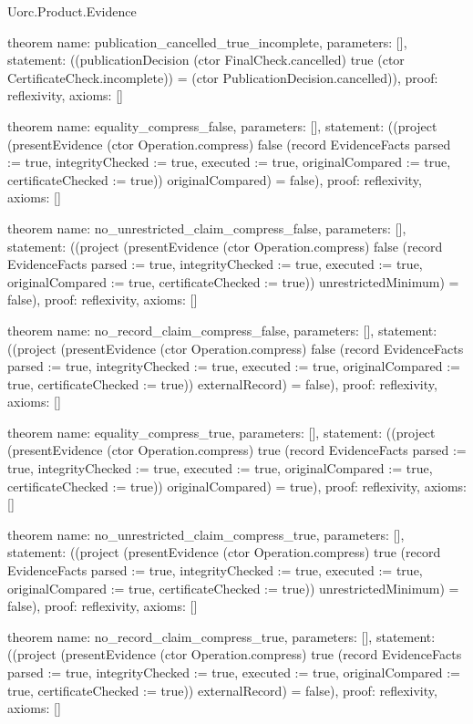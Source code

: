 \begin{lexlean}{Uorc.Product.Evidence}
\begin{semanticmodule}
theorem{
  name: publication_cancelled_true_incomplete,
  parameters: [],
  statement: ((publicationDecision (ctor FinalCheck.cancelled) true (ctor CertificateCheck.incomplete)) = (ctor PublicationDecision.cancelled)),
  proof: reflexivity{},
  axioms: []
}

theorem{
  name: equality_compress_false,
  parameters: [],
  statement: ((project (presentEvidence (ctor Operation.compress) false (record EvidenceFacts {parsed := true, integrityChecked := true, executed := true, originalCompared := true, certificateChecked := true})) originalCompared) = false),
  proof: reflexivity{},
  axioms: []
}

theorem{
  name: no_unrestricted_claim_compress_false,
  parameters: [],
  statement: ((project (presentEvidence (ctor Operation.compress) false (record EvidenceFacts {parsed := true, integrityChecked := true, executed := true, originalCompared := true, certificateChecked := true})) unrestrictedMinimum) = false),
  proof: reflexivity{},
  axioms: []
}

theorem{
  name: no_record_claim_compress_false,
  parameters: [],
  statement: ((project (presentEvidence (ctor Operation.compress) false (record EvidenceFacts {parsed := true, integrityChecked := true, executed := true, originalCompared := true, certificateChecked := true})) externalRecord) = false),
  proof: reflexivity{},
  axioms: []
}

theorem{
  name: equality_compress_true,
  parameters: [],
  statement: ((project (presentEvidence (ctor Operation.compress) true (record EvidenceFacts {parsed := true, integrityChecked := true, executed := true, originalCompared := true, certificateChecked := true})) originalCompared) = true),
  proof: reflexivity{},
  axioms: []
}

theorem{
  name: no_unrestricted_claim_compress_true,
  parameters: [],
  statement: ((project (presentEvidence (ctor Operation.compress) true (record EvidenceFacts {parsed := true, integrityChecked := true, executed := true, originalCompared := true, certificateChecked := true})) unrestrictedMinimum) = false),
  proof: reflexivity{},
  axioms: []
}

theorem{
  name: no_record_claim_compress_true,
  parameters: [],
  statement: ((project (presentEvidence (ctor Operation.compress) true (record EvidenceFacts {parsed := true, integrityChecked := true, executed := true, originalCompared := true, certificateChecked := true})) externalRecord) = false),
  proof: reflexivity{},
  axioms: []
}


\end{semanticmodule}
\end{lexlean}
